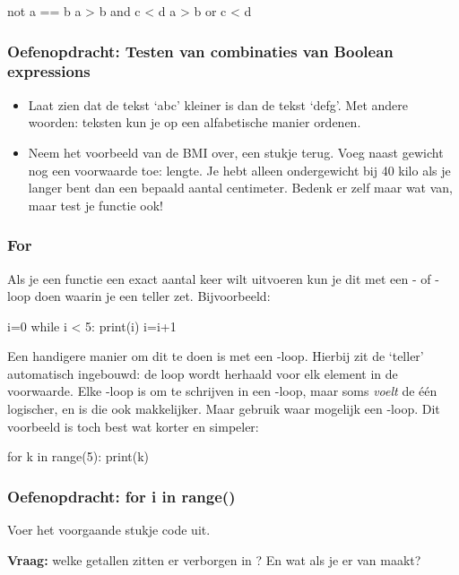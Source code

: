\documentclass[a4paper,11pt, fleqn]{article}
\begin{document}
\begin{python}
not a == b
a > b and c < d
a > b or c < d
\end{python}

\subsubsection*{Oefenopdracht: Testen van combinaties van Boolean expressions} 
\begin{itemize}
\item Laat zien dat de tekst `abc' kleiner is dan de tekst `defg'.
Met andere woorden: teksten kun je op een alfabetische manier ordenen.
\item Neem het voorbeeld van de BMI over, een stukje terug. Voeg naast gewicht nog een voorwaarde toe: lengte. Je hebt alleen ondergewicht bij 40 kilo als je langer bent dan een bepaald aantal centimeter. Bedenk er zelf maar wat van, maar test je functie ook!
\end{itemize}

\subsubsection{For}
Als je een functie een exact aantal keer wilt uitvoeren kun je dit met een - of -loop doen waarin je een teller zet. Bijvoorbeeld:
\begin{python}
i=0
while i < 5:
    print(i)
    i=i+1
\end{python}
Een handigere manier om dit te doen is met een -loop. Hierbij zit de `teller' automatisch ingebouwd: de loop wordt herhaald voor elk element in de voorwaarde. Elke -loop is om te schrijven in een -loop, maar soms \textit{voelt} de \'e\'en logischer, en is die ook makkelijker. Maar gebruik waar mogelijk een -loop. Dit voorbeeld is toch best wat korter en simpeler:

\begin{python}
for k in range(5):
    print(k)
\end{python}

\subsubsection*{Oefenopdracht: for i in range()}
Voer het voorgaande stukje code uit. 

\textbf{Vraag:} welke getallen zitten er verborgen in ? En wat als je er  van maakt?
\end{document}
